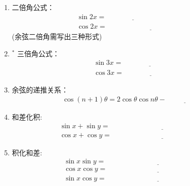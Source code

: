 \documentclass{article}
\newif\ifte
\begin{document}
\begin{multicols}{2}
\begin{enumerate}[leftmargin=20pt]
\item 二倍角公式：
\begin{align*}
    & \sin 2x=\underline{\ \ifte 2\sin x\cos x
        \else \hspace{3cm} \fi\ } \\    
    & \cos 2x=\underline{\ \ifte 2\cos^2 x-1=1-2
     \sin^2 x=\cos^2 x- \sin^2 x\else \hspace{5cm} \fi\ }
\end{align*}
\ifte \else (余弦二倍角需写出三种形式) \fi

\item $^*$ 三倍角公式：
\begin{align*} 
    & \sin 3x=\underline{\ \ifte -4 \sin^3 x+ 3\sin x
        \else \hspace{3cm} \fi\ } 	  \\	
    & \cos 3x=\underline{\ \ifte 4 \cos^3 x- 3\cos x
        \else \hspace{3cm} \fi\ } 
\end{align*}


\item 余弦的递推关系：
\begin{gather*}
    \cos(n+1)\theta=2\cos\theta\cos n\theta-\underline{\ 
        \ifte \cos(n-1)\theta \else \hspace{2cm} \fi\ } 
\end{gather*}

\item 和差化积:
\begin{align*}
    \sin x+\sin y=&\ \underline{\ \ifte 2\sin \left(\dfrac{x+y}{2}
    \right) \cos\left(\dfrac{x-y}{2}\right)\else \hspace{5cm} \fi\ } \\ 
    \cos x+\cos y=&\ \underline{\ \ifte 2\cos \left(\dfrac{x+y}{2}\right) \cos  \left(\dfrac{x-y}{2}\right) \else \hspace{5cm} \fi\ }
\end{align*}

\item 积化和差:
\begin{align*}
    \sin x\sin y=&\ \underline{\ \ifte 
        \dfrac{1}{2}[\cos(x-y)-\cos(x+y)]
        \else \hspace{5cm} \fi\ } \\
    \cos x\cos y=&\ \underline{\ \ifte 
        \dfrac{1}{2}[\cos(x-y)+\cos(x+y)]
        \else \hspace{5cm} \fi\ } \\	
    \sin x\cos y=&\ \underline{\ \ifte 
        \dfrac{1}{2}[\sin(x+y)+\sin(x-y)] 
        \else \hspace{5cm} \fi\ }
\end{align*}


\end{enumerate}
\end{multicols}
\end{document}

